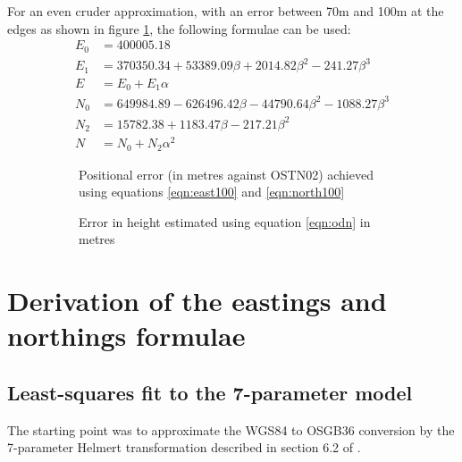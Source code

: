 \documentclass[10pt,a4paper]{article}
\def\gap{\hspace{2cm}}
\begin{document}
For an even cruder approximation, with an error between 70m and 100m at the edges
as shown in figure \ref{fig:hundred-metre-model}, the following formulae can be
used:
\begin{align}
E_0 &= 400005.18\nonumber \\
E_1 &= 370350.34 +53389.09\beta +2014.82\beta^2 -241.27\beta^3\nonumber \\
E &= E_0 +E_1\alpha
  \label{eqn:east100}
\\[2ex]
N_0 &= 649984.89 -626496.42\beta -44790.64\beta^2 -1088.27\beta^3\nonumber \\
N_2 &= 15782.38 +1183.47\beta -217.21\beta^2\nonumber \\
N &= N_0 +N_2\alpha^2
  \label{eqn:north100}
\end{align}

\begin{figure}[htb]
  \begin{subfigure}[b]{0.4\textwidth}
  \centering
  \fbox{
    
  }
  \caption{Positional error (in metres against OSTN02) achieved using equations \eqref{eqn:east100} and \eqref{eqn:north100}}
  \label{fig:hundred-metre-model}
  \end{subfigure}
\gap
  \begin{subfigure}[b]{0.4\textwidth}
  \centering
  \fbox{
    
  }
  \caption{Error in height estimated using equation \eqref{eqn:odn} in metres}
  \label{fig:odn_base}
  \end{subfigure}
\caption{}
\hrulefill
\end{figure}

\section {Derivation of the eastings and northings formulae}
\subsection {Least-squares fit to the 7-parameter model}
\label{sec:lsq_helmert}
The starting point was to approximate the WGS84 to OSGB36 conversion by the
7-parameter Helmert transformation described in section 6.2 of \cite{gcs}.
\end{document}

